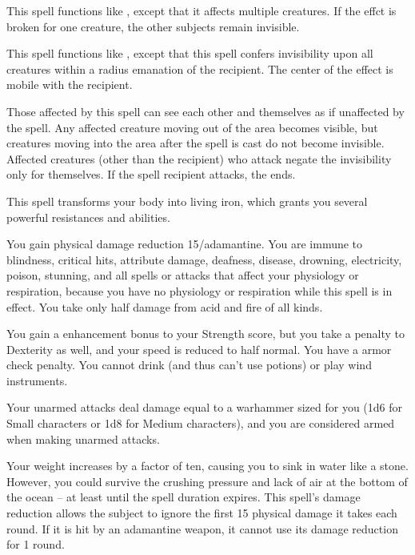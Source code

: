 \spelleffect This spell functions like , except that it affects multiple creatures. If the effct is broken for one creature, the other subjects remain invisible.

\spelleffect This spell functions like , except that this spell confers invisibility upon all creatures within a \areasmall radius emanation of the recipient. The center of the effect is mobile with the recipient.
\par Those affected by this spell can see each other and themselves as if unaffected by the spell. Any affected creature moving out of the area becomes visible, but creatures moving into the area after the spell is cast do not become invisible. Affected creatures (other than the recipient) who attack negate the invisibility only for themselves. If the spell recipient attacks, the  ends.

\spelldur{\durshort \dismissable}
\spelleffect This spell transforms your body into living iron, which grants you several powerful resistances and abilities.
\par You gain physical damage reduction 15/adamantine. You are immune to blindness, critical hits, attribute damage, deafness, disease, drowning, electricity, poison, stunning, and all spells or attacks that affect your physiology or respiration, because you have no physiology or respiration while this spell is in effect. You take only half damage from acid and fire of all kinds.
\par You gain a  enhancement bonus to your Strength score, but you take a  penalty to Dexterity as well, and your speed is reduced to half normal. You have a  armor check penalty. You cannot drink (and thus can't use potions) or play wind instruments.
\par Your unarmed attacks deal damage equal to a warhammer sized for you (1d6 for Small characters or 1d8 for Medium characters), and you are considered armed when making unarmed attacks.
\par Your weight increases by a factor of ten, causing you to sink in water like a stone. However, you could survive the crushing pressure and lack of air at the bottom of the ocean -- at least until the spell duration expires.
\spellnotes This spell's damage reduction allows the subject to ignore the first 15 physical damage it takes each round. If it is hit by an adamantine weapon, it cannot use its damage reduction for 1 round.

